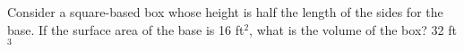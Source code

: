 {Consider a square-based box whose height is half the length of the sides for the base. If the surface area of the base is 16 ft$^2$, what is the volume of the box? }
{32 ft$^3$}
